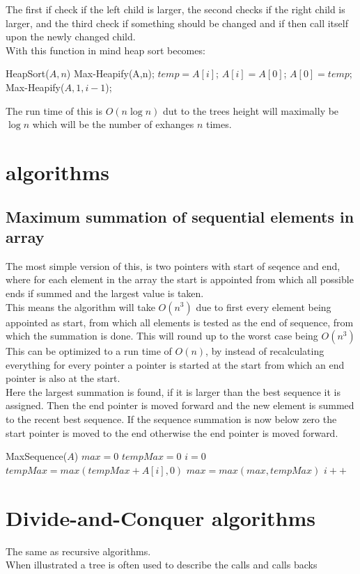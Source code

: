\documentclass[12pt, a4paper]{article}
\begin{document}
				The first if check if the left child is larger, the second checks if the right child is larger, and the third check if something should be changed and if then call itself upon the newly changed child.\\
				With this function in mind heap sort becomes: 
				\begin{algorithmic}[1]
					\State HeapSort($A,n$)
						\State Max-Heapify(A,n);
							\State $temp = A[i]$;
							\State $A[i] = A[0]$;
							\State $A[0] = temp$;
							\State Max-Heapify($A,1,i-1$);
						\EndFor
				\end{algorithmic}
				The run time of this is $O(n\log n)$ dut to the trees height will maximally be $\log n$ which will be the number of exhanges $n$ times.
		\section{algorithms}
			\subsection{Maximum summation of sequential elements in array}
				The most simple version of this, is two pointers with start of seqence and end, where for each element in the array the start is appointed from which all possible ends if summed and the largest value is taken.\\
				This means the algorithm will take $O(n^3)$ due to first every element being appointed as start, from which all elements is tested as the end of sequence, from which the summation is done. This will round up to the worst case being $O(n^3)$\\
				This can be optimized to a run time of $O(n)$, by instead of recalculating everything for every pointer a pointer is started at the start from which an end pointer is also at the start.\\
				Here the largest summation is found, if it is larger than the best sequence it is assigned. Then the end pointer is moved forward and the new element is summed to the recent best sequence. If the sequence summation is now below zero the start pointer is moved to the end otherwise the end pointer is moved forward.
				\begin{algorithmic}[1]
					\State MaxSequence($A$)
					\State $max = 0$
					\State $tempMax = 0$
					\State $i = 0$
					\While {$i<A.length$}
						\State $tempMax = max(tempMax + A[i], 0)$
						\State $max = max(max, tempMax)$
						\State $i++$
					\EndWhile
				\end{algorithmic}
		\section{Divide-and-Conquer algorithms}
			The same as recursive algorithms.\\
			When illustrated a tree is often used to describe the calls and calls backs
				
	
				
\end{document}

